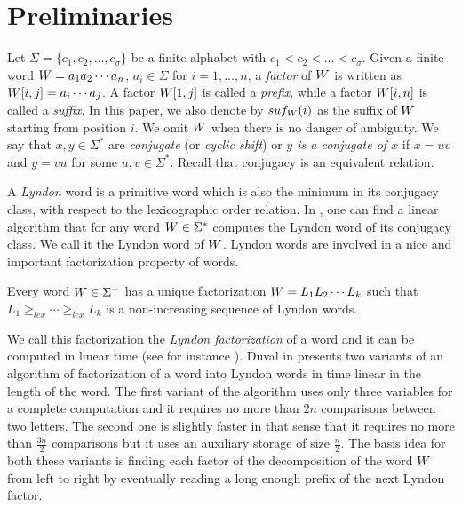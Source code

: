 \documentclass[envcountsame,runningheads]{llncs}
\begin{document}
\section{Preliminaries}\label{sec:prel}

Let $\Sigma =\{c_1, c_2, \ldots, c_\sigma\}$ be a finite alphabet with $c_1 < c_2 < \ldots < c_\sigma$.
Given a finite word $W=a_1a_2\cdots a_{n}$, $a_i \in \Sigma$ for $i=1,\ldots,n$,
a \emph{factor} of $W$ is written as $W[i,j] = a_i \cdots a_j$. A factor $W[1,j]$ is called a \emph{prefix}, while a factor $W[i,n]$ is called a \emph{suffix}.
In this paper, we also denote by $suf_W(i)$ as the suffix of $W$ starting from position $i$. We omit $W$ when there is no danger of ambiguity.
We say that $x,y\in \Sigma^*$ are {\em conjugate} (or \emph{cyclic shift}) or \emph{$y$ is a conjugate of $x$} if $x=uv$ and $y=vu$ for some $u,v\in \Sigma^*$. Recall that conjugacy is an equivalent relation.

A {\em Lyndon} word is a primitive word which is also the minimum in its conjugacy class, with respect to the lexicographic order relation.
In \cite{Lothaire:2005,Duval1983}, one can find a linear algorithm that for any word $W \in \Sigma^*$ computes the Lyndon word of its conjugacy class.
We call it the Lyndon word of $W$.
Lyndon words are involved in a nice and important factorization property of words.
\begin{theorem}\cite{ChenFoxLyndon1958}
Every word $W \in \Sigma^+$ has a unique factorization $W=L_1L_2 \cdots L_k$ such that $L_1\geq_{lex} \cdots \geq_{lex} L_k$ is a non-increasing sequence of Lyndon words.
\end{theorem}
We call this factorization the \emph{Lyndon factorization}  of a word and it can be computed in linear time (see for instance \cite{Duval1983,Lothaire:2005}).
Duval in \cite{Duval1983} presents two variants of an algorithm of factorization of a word into Lyndon words in time linear in the length of the word.
The first variant of the algorithm uses only three variables for a complete computation and it requires no more than $2n$ comparisons between two letters.
The second one is slightly faster in that sense that it requires no more than $\frac{3n}{2}$ comparisons but it uses an auxiliary storage of size $\frac{n}{2}$.
The basis idea for both these variants is finding each factor of the decomposition of the word $W$ from left to right by eventually reading a long enough prefix of the next Lyndon factor.
\end{document}
